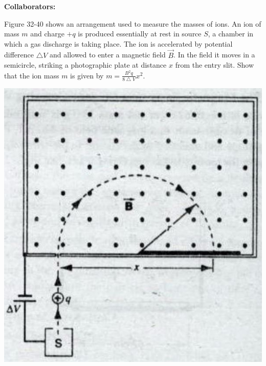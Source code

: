 \documentclass[11pt,letterpaper,boxed]{hmcpset}
\begin{document}
	
	\noindent\textbf{Collaborators:} 
	
	
	\begin{problem} [*HRK P32.6] Figure 32-40 shows an arrangement used to measure the masses of ions. An ion of mass $m$ and charge $+q$ is produced essentially at rest in source $S$, a chamber in which a gas discharge is taking place. The ion is accelerated by potential difference $\bigtriangleup V$ and allowed to enter a magnetic field $\vec{B}$. In the field it moves in a semicircle, striking a photographic plate at distance $x$ from the entry slit. Show that the ion mass $m$ is given by $m = \frac{B^2 q}{8\bigtriangleup V} x^2$.
		\begin{center}
		\includegraphics[scale=.3]{51m8pic.jpg}
		\end{center}
		
	\end{problem}
	
	\begin{solution}
		\vfill
	\end{solution}
	\newpage
\end{document}
